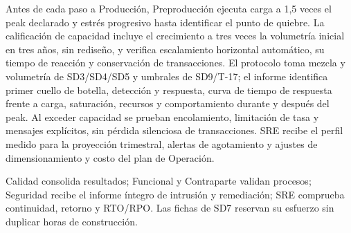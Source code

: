 Antes de cada paso a Producción, Preproducción ejecuta carga a 1,5 veces el peak declarado y estrés progresivo hasta identificar el punto de quiebre. La calificación de capacidad incluye el crecimiento a tres veces la volumetría inicial en tres años, sin rediseño, y verifica escalamiento horizontal automático, su tiempo de reacción y conservación de transacciones. El protocolo toma mezcla y volumetría de SD3/SD4/SD5 y umbrales de SD9/T-17; el informe identifica primer cuello de botella, detección y respuesta, curva de tiempo de respuesta frente a carga, saturación, recursos y comportamiento durante y después del peak. Al exceder capacidad se prueban encolamiento, limitación de tasa y mensajes explícitos, sin pérdida silenciosa de transacciones. SRE recibe el perfil medido para la proyección trimestral, alertas de agotamiento y ajustes de dimensionamiento y costo del plan de Operación. \parencite[RT-09.03--09, pp.~21--22]{sd6-bt}

Calidad consolida resultados; Funcional y Contraparte validan procesos; Seguridad recibe el informe íntegro de intrusión y remediación; SRE comprueba continuidad, retorno y RTO/RPO. Las fichas de SD7 reservan su esfuerzo sin duplicar horas de construcción.

